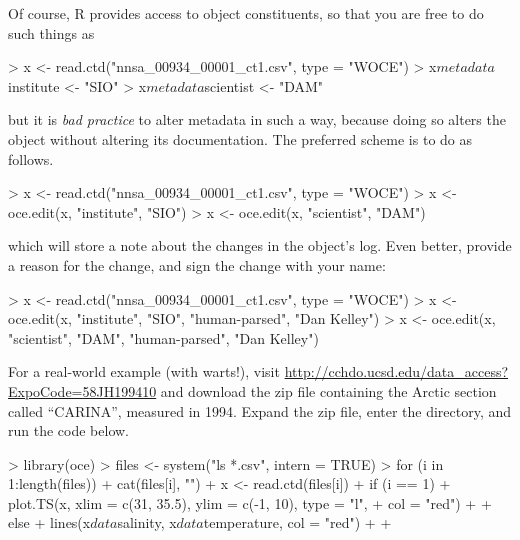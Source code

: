 \documentclass{article}
\begin{document}
Of course, R provides access to object constituents, so that you are
free to do such things as
\begin{Schunk}
\begin{Sinput}
> x <- read.ctd("nnsa_00934_00001_ct1.csv", type = "WOCE")
> x$metadata$institute <- "SIO"
> x$metadata$scientist <- "DAM"
\end{Sinput}
\end{Schunk}
but it is \emph{bad practice} to alter metadata in such a way, because
doing so alters the object without altering its documentation.  The
preferred scheme is to do as follows.
\begin{Schunk}
\begin{Sinput}
> x <- read.ctd("nnsa_00934_00001_ct1.csv", type = "WOCE")
> x <- oce.edit(x, "institute", "SIO")
> x <- oce.edit(x, "scientist", "DAM")
\end{Sinput}
\end{Schunk}
which will store a note about the changes in the object's log.  Even
better, provide a reason for the change, and sign the change with your
name:
\begin{Schunk}
\begin{Sinput}
> x <- read.ctd("nnsa_00934_00001_ct1.csv", type = "WOCE")
> x <- oce.edit(x, "institute", "SIO", "human-parsed", "Dan Kelley")
> x <- oce.edit(x, "scientist", "DAM", "human-parsed", "Dan Kelley")
\end{Sinput}
\end{Schunk}

For a real-world example (with warts!), visit
\url{http://cchdo.ucsd.edu/data_access?ExpoCode=58JH199410} and download the zip
file containing the Arctic section called ``CARINA'', measured in 1994. Expand
the zip file, enter the directory, and run the code below.
\begin{Schunk}
\begin{Sinput}
> library(oce)
> files <- system("ls *.csv", intern = TRUE)
> for (i in 1:length(files)) {
+     cat(files[i], "\n")
+     x <- read.ctd(files[i])
+     if (i == 1) {
+         plot.TS(x, xlim = c(31, 35.5), ylim = c(-1, 10), type = "l", 
+             col = "red")
+     }
+     else {
+         lines(x$data$salinity, x$data$temperature, col = "red")
+     }
+ }
\end{Sinput}
\end{Schunk}
\end{document}
